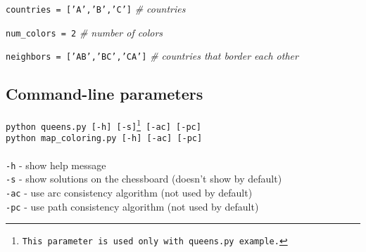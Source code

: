 \documentclass[a4paper]{article}
\begin{document}
\texttt{countries = ['A','B','C']} \textit{\# countries}

\texttt{num\_colors = 2} \textit{\# number of colors}

\texttt{neighbors = ['AB','BC','CA']} \textit{\# countries that border each other}
\subsection{Command-line parameters}

\texttt{python queens.py [-h] [-s]\footnote{This parameter is used only with \texttt{queens.py} example.} [-ac] [-pc]}\\
\texttt{python map\_coloring.py [-h] [-ac] [-pc]}\\\\
\texttt{-h} - show help message\\
\texttt{-s} - show solutions on the chessboard (doesn't show by default)\\
\texttt{-ac} - use arc consistency algorithm (not used by default)\\
\texttt{-pc} - use path consistency algorithm (not used by default)\\
\end{document}
